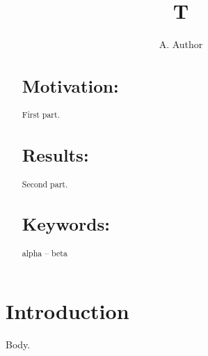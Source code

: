 \documentclass{absfront}
\def\keyFont{\fontsize{8}{11}\bfseries}
\begin{document}
\title{T}\author{A. Author}
\maketitle
\begin{abstract}
\section{Motivation:} First part.
\section{Results:} Second part.

\keyFont{\section{Keywords:} alpha -- beta}
\end{abstract}
\section{Introduction}
Body.
\end{document}

